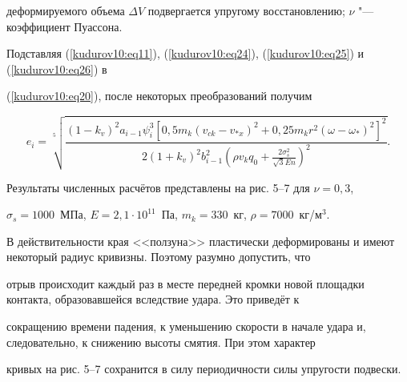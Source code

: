 деформируемого объема $\Delta V$ подвергается упругому восстановлению; $\nu

$ "--- коэффициент Пуассона.



Подставляя (\ref{kudurov10:eq11}), (\ref{kudurov10:eq24}), (\ref{kudurov10:eq25}) и (\ref{kudurov10:eq26}) в

(\ref{kudurov10:eq20}), после некоторых преобразований получим

\begin{equation*}


e_i =\sqrt[5]{\frac{\left( 1-k_v  \right)^2a_{i-1} \psi_i^3 \left[ 0,5 m_k \left( v _{ck}

- v_{\ast x} \right)^2 + 0,25 m_k r^2 \left( \omega -\omega_\ast \right)^2 \right]^2}{2\left( 1 + k_v

\right)^2b_{i-1}^2 \left( \rho v_k q_0 + \frac{2\sigma_s^2}{\sqrt 3 En} \right)^2}}.

\end{equation*}

Результаты численных расчётов представлены на рис. 5--7 для $\nu =0,3$,

$\sigma_s =1000$~МПа, $E=2,1 \cdot 10^{11}$~Па, $m_k =330$~кг, $\rho

=7000$~кг/м$^3$.





В действительности края <<ползуна>> пластически деформированы и имеют некоторый радиус кривизны. Поэтому разумно допустить, что

отрыв происходит каждый раз в месте передней кромки новой площадки контакта, образовавшейся вследствие удара. Это приведёт к

сокращению времени падения, к уменьшению скорости в начале удара и, следовательно, к снижению высоты смятия. При этом характер

кривых на рис. 5--7 сохранится в силу периодичности силы упругости подвески.



